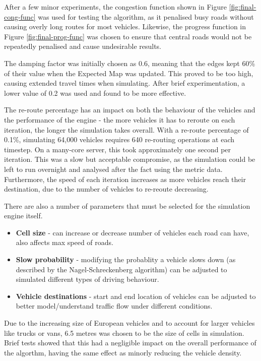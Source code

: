 \documentclass[ %
                    author={Alexander Hill},
                supervisor={Dr. Benjamin Sach},
                    degree={MEng},
                     title={MARMOSET},
                  subtitle={Multi-Agent Route Management using Online Simulation for Efficient Transportation},
                      type={research},
                      year={2016} ]{dissertation}
\begin{document}
After a few minor experiments, the congestion function shown in Figure
\ref{fig:final-cong-func} was used for testing the algorithm, as it penalised
busy roads without causing overly long routes for most vehicles. Likewise, the
progress function in Figure \ref{fig:final-prog-func} was chosen to ensure that
central roads would not be repeatedly penalised and cause undesirable results.

The damping factor was initially chosen as 0.6, meaning that the edges kept 60\%
of their value when the Expected Map was updated. This proved to be too high,
causing extended travel times when simulating. After brief experimentation, a
lower value of 0.2 was used and found to be more effective.

The re-route percentage has an impact on both the behaviour of the vehicles and
the performance of the engine - the more vehicles it has to reroute on each
iteration, the longer the simulation takes overall. With a re-route percentage
of 0.1\%, simulating 64,000 vehicles requires 640 re-routing operations at each
timestep. On a many-core server, this took approximately one second per
iteration. This was a slow but acceptable compromise, as the simulation could be
left to run overnight and analysed after the fact using the metric data.
Furthermore, the speed of each iteration increases as more vehicles reach their
destination, due to the number of vehicles to re-reoute decreasing.

There are also a number of parameters that must be selected for the simulation
engine itself.

\begin{itemize}
    \item \textbf{Cell size} - can increase or decrease number of vehicles each
        road can have, also affects max speed of roads.
    \item \textbf{Slow probability} - modifying the probablity a vehicle slows
        down (as described by the Nagel-Schreckenberg algorithm) can be adjusted
        to simulated different types of driving behaviour.
    \item \textbf{Vehicle destinations} - start and end location of vehicles can
        be adjusted to better model/understand traffic flow under different
        conditions.
\end{itemize}

Due to the increasing size of European vehicles and to account for
larger vehicles like trucks or vans, 6.5 metres was chosen to be the size of
cells in simulation. Brief tests showed that this had a negligible impact on
the overall performance of the algorthm, having the same effect as minorly
reducing the vehicle density.
\end{document}

